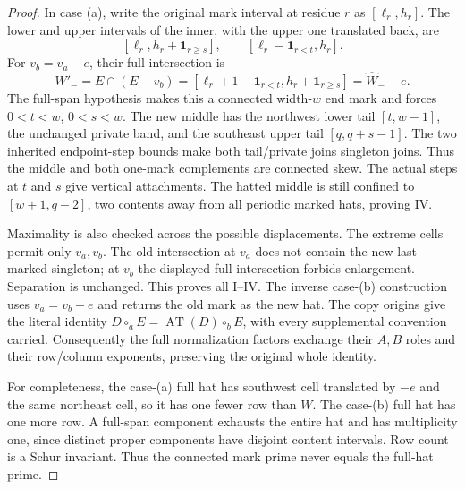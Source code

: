 \documentclass[11pt,a4paper]{amsart}
\numberwithin{equation}{section}
\theoremstyle{plain}
\theoremstyle{definition}
\newcommand{\one}{\mathbf1}
\newcommand{\AT}{\operatorname{AT}}
\begin{document}
\begin{proof}
In case (a), write the original mark interval at residue \(r\) as
\([\ell_r,h_r]\).  The lower and upper intervals of the inner, with the upper
one translated back, are
\[
 [\ell_r,h_r+\one_{r\ge s}],\qquad
 [\ell_r-\one_{r<t},h_r].
\]
For \(v_b=v_a-e\), their full intersection is
\[
 W'_-=E\cap(E-v_b)
      =[\ell_r+1-\one_{r<t},h_r+\one_{r\ge s}]
      =\widehat W_-+e.
\]
The full-span hypothesis makes this a connected width-\(w\) end mark and
forces \(0<t<w\), \(0<s<w\).  The new middle has the northwest lower tail
\([t,w-1]\), the unchanged private band, and the southeast upper tail
\([q,q+s-1]\).  The two inherited endpoint-step bounds make both tail/private
joins singleton joins.  Thus the middle and both one-mark complements
are connected skew.  The actual steps at \(t\) and \(s\) give vertical
attachments.  The hatted middle is still confined to \([w+1,q-2]\), two
contents away from all periodic marked hats, proving IV.

Maximality is also checked across the possible displacements.  The extreme
cells permit only \(v_a,v_b\).  The old intersection at \(v_a\) does not contain
the new last marked singleton; at \(v_b\) the displayed full intersection
forbids enlargement.  Separation is unchanged.  This proves all I--IV.
The inverse case-(b) construction uses \(v_a=v_b+e\) and returns the old
mark as the new hat.  The copy origins give the literal identity
\(D\circ_aE=\AT(D)\circ_bE\), with every supplemental convention carried.
Consequently the full normalization factors exchange their \(A,B\) roles
and their row/column exponents, preserving the original whole identity.

For completeness, the case-(a) full hat has southwest cell translated
by \(-e\) and the same northeast cell, so it has one fewer row than \(W\).
The case-(b) full hat has one more row.  A full-span component exhausts
the entire hat and has multiplicity one, since distinct proper components
have disjoint content intervals.  Row count is a Schur invariant.
Thus the connected mark prime never equals the full-hat prime.
\end{proof}
\end{document}
